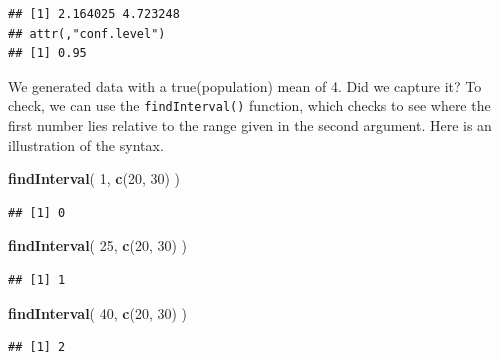 \documentclass[
]{book}
\newenvironment{Shaded}{\begin{snugshade}}{\end{snugshade}}
\newcommand{\CommentTok}[1]{\textcolor[rgb]{0.56,0.35,0.01}{\textit{#1}}}
\newcommand{\DecValTok}[1]{\textcolor[rgb]{0.00,0.00,0.81}{#1}}
\newcommand{\FunctionTok}[1]{\textcolor[rgb]{0.13,0.29,0.53}{\textbf{#1}}}
\newcommand{\NormalTok}[1]{#1}
\newcommand{\SpecialCharTok}[1]{\textcolor[rgb]{0.81,0.36,0.00}{\textbf{#1}}}
\begin{document}
\begin{Shaded}
\end{Shaded}

\begin{verbatim}
## [1] 2.164025 4.723248
## attr(,"conf.level")
## [1] 0.95
\end{verbatim}

We generated data with a true(population) mean of 4. Did we capture it? To check, we can use the \texttt{findInterval()} function, which checks to see where the first number lies relative to the range given in the second argument.
Here is an illustration of the syntax.

\begin{Shaded}
\begin{Highlighting}[]
\FunctionTok{findInterval}\NormalTok{( }\DecValTok{1}\NormalTok{, }\FunctionTok{c}\NormalTok{(}\DecValTok{20}\NormalTok{, }\DecValTok{30}\NormalTok{) )}
\end{Highlighting}
\end{Shaded}

\begin{verbatim}
## [1] 0
\end{verbatim}

\begin{Shaded}
\begin{Highlighting}[]
\FunctionTok{findInterval}\NormalTok{( }\DecValTok{25}\NormalTok{, }\FunctionTok{c}\NormalTok{(}\DecValTok{20}\NormalTok{, }\DecValTok{30}\NormalTok{) )}
\end{Highlighting}
\end{Shaded}

\begin{verbatim}
## [1] 1
\end{verbatim}

\begin{Shaded}
\begin{Highlighting}[]
\FunctionTok{findInterval}\NormalTok{( }\DecValTok{40}\NormalTok{, }\FunctionTok{c}\NormalTok{(}\DecValTok{20}\NormalTok{, }\DecValTok{30}\NormalTok{) )}
\end{Highlighting}
\end{Shaded}

\begin{verbatim}
## [1] 2
\end{verbatim}
\end{document}
